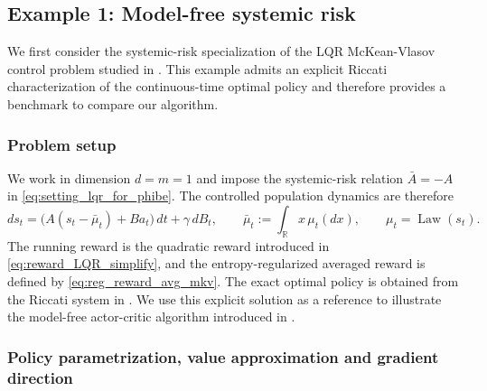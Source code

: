 \documentclass[a4paper, 10pt, english, reqno]{amsart}
\DeclareMathOperator*{\Law}{\text{Law}}
\begin{document}
\subsection{Example 1: Model-free systemic risk}
\label{subsec:numerics-lqr-phibe}

We first consider the systemic-risk specialization of the LQR McKean-Vlasov control problem studied in . This example admits an explicit Riccati characterization of the continuous-time optimal policy and therefore provides a benchmark to compare our algorithm.

\subsubsection{Problem setup}

We work in dimension $d=m=1$ and impose the systemic-risk relation $\bar A=-A$ in \eqref{eq:setting_lqr_for_phibe}. The controlled population dynamics are therefore
\[
  d s_t
  =
  \bigl(A(s_t-\bar\mu_t)+B a_t\bigr)\,dt
  +
  \gamma\,dB_t,
  \qquad
  \bar\mu_t:=\int_{\mathbb R}x\,\mu_t(dx),
  \qquad
  \mu_t=\Law(s_t).
\]
The running reward is the quadratic reward introduced in \eqref{eq:reward_LQR_simplify}, and the entropy-regularized averaged reward is defined by \eqref{eq:reg_reward_avg_mkv}. The exact optimal policy is obtained from the Riccati system in . We use this explicit solution as a reference to illustrate the model-free actor-critic algorithm introduced in .

\subsubsection{Policy parametrization, value approximation and gradient direction}
\end{document}
